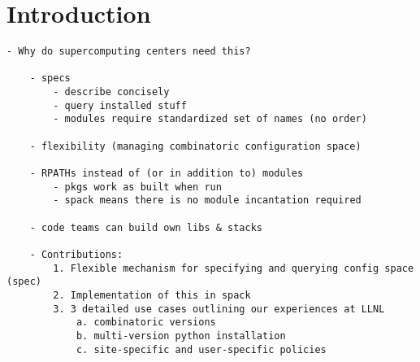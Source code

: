 
\section{Introduction}
\label{sec:intro}










\begin{verbatim}
- Why do supercomputing centers need this?

	- specs
		- describe concisely
		- query installed stuff
		- modules require standardized set of names (no order)

	- flexibility (managing combinatoric configuration space)

	- RPATHs instead of (or in addition to) modules
		- pkgs work as built when run
		- spack means there is no module incantation required

	- code teams can build own libs & stacks

	- Contributions:
		1. Flexible mechanism for specifying and querying config space (spec)
		2. Implementation of this in spack
		3. 3 detailed use cases outlining our experiences at LLNL
			a. combinatoric versions
			b. multi-version python installation
			c. site-specific and user-specific policies
\end{verbatim}

